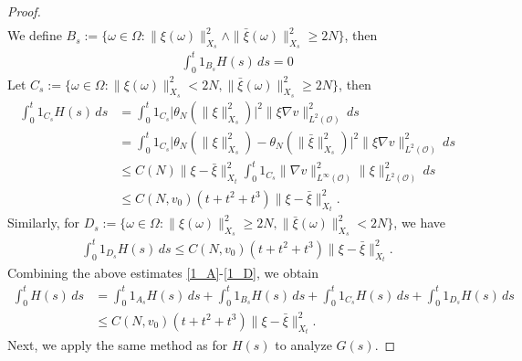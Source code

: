 \documentclass[reqno, 11pt]{amsart}
\theoremstyle{definition}
\numberwithin{equation}{section} \numberwithin{lem}{section}
\numberwithin{thm}{section} \numberwithin{prop}{section}
\numberwithin{cor}{section} \numberwithin{rem}{section}
\numberwithin{defn}{section}
\begin{document}
\begin{proof}
\begin{align}
\end{align}
We define $B_s:=\big\{\omega\in\Omega:\|\xi(\omega)\|_{X_s}^2\wedge \|\bar \xi(\omega)\|_{X_s}^2\ge 2N\big\}$, then
    \begin{align}\label{1_B}
        \int_0^t1_{B_s}H(s)\,ds=0
\end{align}
Let $C_s:=\big\{\omega\in\Omega:\|\xi(\omega)\|_{X_s}^2< 2N, \|\bar \xi(\omega)\|_{X_s}^2\ge 2N\big\}$, then
    \begin{align}\label{1_C}
        \nonumber\int_0^t1_{C_s}H(s)\,ds&=\int_0^t1_{C_s}\Big|\theta_N(\|\xi\|_{X_s}^2)\Big|^2\|\xi\nabla v\|_{L^2(\mathcal {O})}^2\,ds\\
        \nonumber&=\int_0^t1_{C_s}\Big|\theta_N(\|\xi\|_{X_s}^2)-\theta_N(\|\bar \xi\|_{X_s}^2)\Big|^2\|\xi\nabla v\|_{L^2(\mathcal {O})}^2\,ds\\
        \nonumber&\le C(N)\|\xi- \bar \xi\|_{X_t}^2\int_0^t1_{C_s}\|\nabla v\|_{L^\infty(\mathcal {O})}^2\|\xi\|_{L^2(\mathcal {O})}^2\,ds\\&\le C(N,v_0)(t+t^2+t^3)\|\xi-\bar \xi\|_{X_t}^2.
\end{align}
Similarly, for $D_s:=\big\{\omega\in\Omega:\|\xi(\omega)\|_{X_s}^2\ge 2N, \|\bar \xi(\omega)\|_{X_s}^2< 2N\big\}$, we have 
    \begin{align}\label{1_D}
        \int_0^t 1_{D_s}H(s)\,ds\le C(N,v_0)(t+t^2+t^3)\|\xi-\bar \xi\|_{X_t}^2.
\end{align}
Combining the above estimates \eqref{1_A}-\eqref{1_D}, we obtain
\begin{align}\label{H(s)}
\nonumber\int_0^tH(s)\,ds&=\int_0^t1_{A_s}H(s)\,ds+\int_0^t1_{B_s}H(s)\,ds+\int_0^t1_{C_s}H(s)\,ds+\int_0^t1_{D_s}H(s)\,ds\\&\le C(N,v_0)(t+t^2+t^3)\|\xi-\bar \xi\|_{X_t}^2.
\end{align}
 Next, we apply the same method as for $H(s)$ to analyze $G(s)$. 
 

\end{proof}
\end{document}
